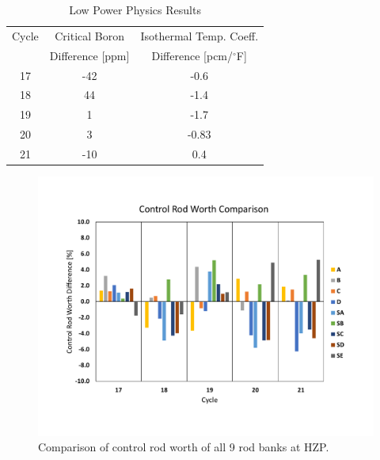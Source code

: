 \documentclass[edeposit,fullpage,12pt]{uiucthesis2009}
\begin{document}
\begin{table}
\caption{Low Power Physics Results}
\label{tab:cb}
\begin{center}
\begin{tabular}[!t]{|c|c|c|}
\hline
Cycle      & Critical Boron   & Isothermal Temp. Coeff.      \\
           & Difference [ppm] & Difference [pcm/$^{\circ}$F]  \\ \hline
17 & -42 & -0.6     \\\hline
18 & 44  & -1.4     \\\hline
19 & 1   & -1.7     \\\hline
20 & 3 & -0.83     \\\hline
21 & -10 & 0.4     \\\hline
\end{tabular}
\end{center}
\end{table}



\begin{figure}
\begin{center}
\includegraphics[trim={0 2cm 0 2cm},clip,width=0.5\linewidth]{./Figures/crw_diff.pdf}
\end{center}
\caption{Comparison of control rod worth of all 9 rod banks at HZP.}
\label{fig:crw}
\end{figure} 
\end{document}
